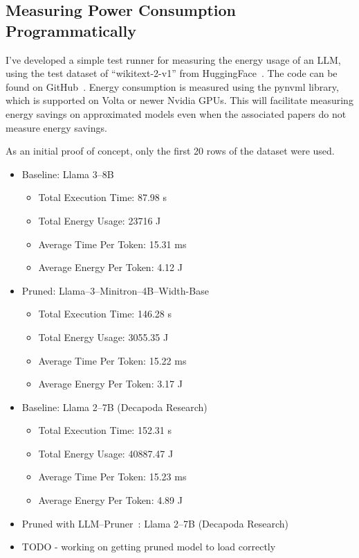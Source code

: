 \documentclass{article}
\begin{document}
    \subsection{Measuring Power Consumption Programmatically}\label{subsec:measuring-power-consumption-locally}
    I've developed a simple test runner for measuring the energy usage of an LLM, using the test dataset of ``wikitext-2-v1'' from HuggingFace~\cite{merity2016pointersentinelmixturemodels}.
    The code can be found on GitHub~\cite{llm-test-runner}.
    Energy consumption is measured using the pynvml library, which is supported on Volta or newer Nvidia GPUs. This will facilitate measuring energy savings on approximated models even when the associated papers do not measure energy savings.

    As an initial proof of concept, only the first 20 rows of the dataset were used.

    \begin{itemize}
        \item Baseline: Llama 3--8B
        \begin{itemize}
            \item Total Execution Time: 87.98 s
            \item Total Energy Usage: 23716 J
            \item Average Time Per Token: 15.31 ms
            \item Average Energy Per Token: 4.12 J
        \end{itemize}
        \item Pruned: Llama--3--Minitron--4B--Width-Base
        \begin{itemize}
            \item Total Execution Time: 146.28 s
            \item Total Energy Usage: 3055.35 J
            \item Average Time Per Token: 15.22 ms
            \item Average Energy Per Token: 3.17 J
        \end{itemize}
        \item Baseline: Llama 2--7B (Decapoda Research)~\cite{decapoda-llama-7B}
        \begin{itemize}
            \item Total Execution Time: 152.31 s
            \item Total Energy Usage: 40887.47 J
            \item Average Time Per Token: 15.23 ms
            \item Average Energy Per Token: 4.89 J
        \end{itemize}
        \item Pruned with LLM--Pruner~\cite{ma2023llm}: Llama 2--7B (Decapoda Research)
        \item TODO - working on getting pruned model to load correctly
    \end{itemize}
\end{document}
